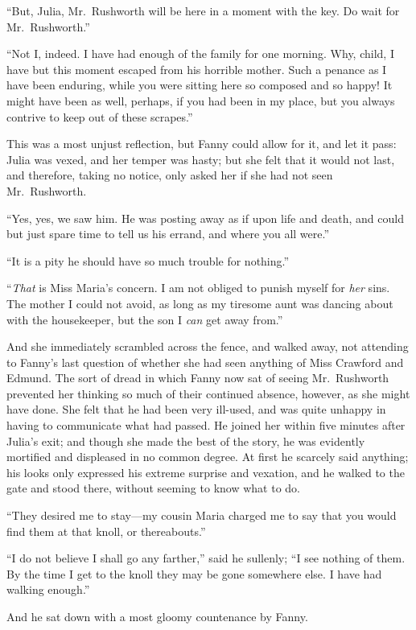 ``But, Julia, Mr.\ Rushworth will be here in a moment
with the key.  Do wait for Mr.\ Rushworth.''

``Not I, indeed.  I have had enough of the family for
one morning.  Why, child, I have but this moment escaped from
his horrible mother.  Such a penance as I have been enduring,
while you were sitting here so composed and so happy!
It might have been as well, perhaps, if you had been in
my place, but you always contrive to keep out of these scrapes.''

This was a most unjust reflection, but Fanny could allow
for it, and let it pass:  Julia was vexed, and her
temper was hasty; but she felt that it would not last,
and therefore, taking no notice, only asked her if she
had not seen Mr.\ Rushworth.

``Yes, yes, we saw him.  He was posting away as if upon
life and death, and could but just spare time to tell us
his errand, and where you all were.''

``It is a pity he should have so much trouble for nothing.''

``\emph{That} is Miss Maria's concern.  I am not obliged
to punish myself for \emph{her} sins.  The mother I could
not avoid, as long as my tiresome aunt was dancing about
with the housekeeper, but the son I \emph{can} get away from.''

And she immediately scrambled across the fence,
and walked away, not attending to Fanny's last question of
whether she had seen anything of Miss Crawford and Edmund.
The sort of dread in which Fanny now sat of seeing
Mr.\ Rushworth prevented her thinking so much of their
continued absence, however, as she might have done.
She felt that he had been very ill-used, and was quite
unhappy in having to communicate what had passed.
He joined her within five minutes after Julia's exit;
and though she made the best of the story, he was evidently
mortified and displeased in no common degree.  At first
he scarcely said anything; his looks only expressed his
extreme surprise and vexation, and he walked to the gate
and stood there, without seeming to know what to do.

``They desired me to stay---my cousin Maria charged me to say
that you would find them at that knoll, or thereabouts.''

``I do not believe I shall go any farther,'' said he sullenly;
``I see nothing of them.  By the time I get to the knoll they
may be gone somewhere else.  I have had walking enough.''

And he sat down with a most gloomy countenance by Fanny.

